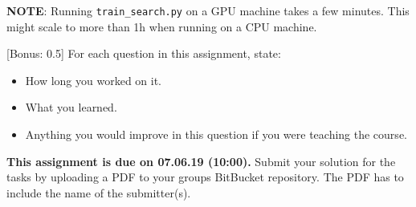 \documentclass{exam}
\newcommand{\duedate}{07.06.19 (10:00)}
\newcommand{\due}{{\bf This assignment is due on \duedate.} }
\begin{document}
\begin{questions}
\begin{parts}
		\textbf{NOTE}: Running \texttt{train\_search.py} on a GPU machine takes a few minutes. This might scale to more than 1h when running on a CPU machine.

		\end{parts}

		[Bonus: 0.5]
		For each question in this assignment, state:
		\begin{itemize}
			\item How long you worked on it.
			\item What you learned.
			\item Anything you would improve in this question if you were teaching the course.
		\end{itemize}
	\end{questions}
	
	\noindent
	\due Submit your solution for the tasks by uploading a PDF to your groups BitBucket repository. The PDF has to include the name of the submitter(s).
\end{document}
